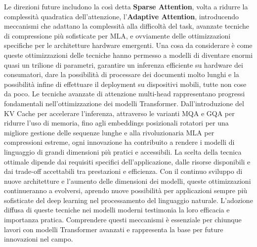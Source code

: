 Le direzioni future includono la così detta \textbf{Sparse Attention}, volta a ridurre la complessità quadratica dell'attenzione, l'\textbf{Adaptive Attention}, introducendo meccanismi che adattano la complessità alla difficoltà del task, avanzate tecniche di compressione più sofisticate per MLA, e ovviamente delle ottimizzazioni specifiche per le architetture hardware emergenti. Una cosa da considerare è come queste ottimizzazioni delle tecniche hanno permesso a modelli di diventare enormi quasi un trilione di parametri, garantire un inferenza efficiente su hardware dei consumatori, dare la possibilità di processare dei documenti molto lunghi e la possibilità infine di effettuare il deployment su dispositivi mobili, tutte non cose da poco. Le tecniche avanzate di attenzione multi-head rappresentano progressi fondamentali nell'ottimizzazione dei modelli Transformer. Dall'introduzione del KV Cache per accelerare l'inferenza, attraverso le varianti MQA e GQA per ridurre l'uso di memoria, fino agli embeddings posizionali rotatori per una migliore gestione delle sequenze lunghe e alla rivoluzionaria MLA per compressioni estreme, ogni innovazione ha contribuito a rendere i modelli di linguaggio di grandi dimensioni più pratici e accessibili. La scelta della tecnica ottimale dipende dai requisiti specifici dell'applicazione, dalle risorse disponibili e dai trade-off accettabili tra prestazioni e efficienza. Con il continuo sviluppo di nuove architetture e l'aumento delle dimensioni dei modelli, queste ottimizzazioni continueranno a evolversi, aprendo nuove possibilità per applicazioni sempre più sofisticate del deep learning nel processamento del linguaggio naturale. L'adozione diffusa di queste tecniche nei modelli moderni testimonia la loro efficacia e importanza pratica. Comprendere questi meccanismi è essenziale per chiunque lavori con modelli Transformer avanzati e rappresenta la base per future innovazioni nel campo.